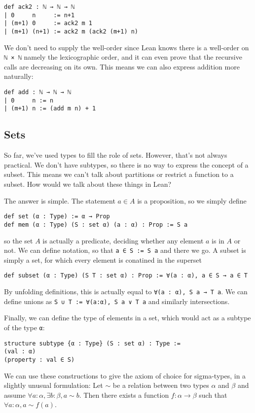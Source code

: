\documentclass[a4paper, 12pt]{article}
\newcommand{\lean}[1]{\texttt{#1}}
\theoremstyle{changedot}
\theoremstyle{changedotbreak}
\theoremstyle{nonumberplain}
\begin{document}
\begin{verbatim}
def ack2 : ℕ → ℕ → ℕ
| 0     n     := n+1
| (m+1) 0     := ack2 m 1
| (m+1) (n+1) := ack2 m (ack2 (m+1) n)
\end{verbatim}
We don't need to supply the well-order since Lean knows there is a well-order on \lean{ℕ × ℕ} namely the lexicographic order, and it can even prove that the recursive calls are decreasing on its own. This means we can also express addition more naturally:

\begin{verbatim}
def add : ℕ → ℕ → ℕ
| 0     n := n
| (m+1) n := (add m n) + 1
\end{verbatim}

\subsection{Sets}\label{ssec:sets}
So far, we've used types to fill the role of sets. However, that's not always practical. We don't have subtypes, so there is no way to express the concept of a subset. This means we can't talk about partitions or restrict a function to a subset. How would we talk about these things in Lean?

The answer is simple. The statement $a \in A$ is a proposition, so we simply define
\begin{verbatim}
def set (α : Type) := α → Prop
def mem (α : Type) (S : set α) (a : α) : Prop := S a
\end{verbatim}
so the set $A$ is actually a predicate, deciding whether any element $a$ is in $A$ or not. We can define notation, so that \lean{a ∈ S := S a} and there we go. A subset is simply a set, for which every element is conatined in the superset
\begin{verbatim}
def subset (α : Type) (S T : set α) : Prop := ∀(a : α), a ∈ S → a ∈ T
\end{verbatim}
By unfolding definitions, this is actually equal to \lean{∀(a : α), S a → T a}. We can define unions as \lean{S ∪ T := ∀(a:α), S a ∨ T a} and similarly intersections.

Finally, we can define the type of elements in a set, which would act as a subtype of the type \lean{α}:

\begin{verbatim}
structure subtype {α : Type} (S : set α) : Type :=
(val : α)
(property : val ∈ S)
\end{verbatim}

We can use these constructions to give the axiom of choice for sigma-types, in a slightly unusual formulation: Let $\sim$ be a relation between two types $\alpha$ and $\beta$ and assume $\forall a : \alpha, \exists b : \beta, a \sim b$. Then there exists a function $f : \alpha \to \beta$ such that $\forall a : \alpha, a \sim f(a)$.
\end{document}
